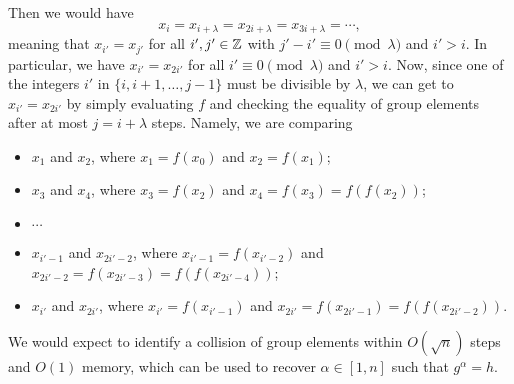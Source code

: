 Then we would have 
\[ x_i = x_{i+\lambda} = x_{2i+\lambda} = x_{3i+\lambda} = \cdots, \]
meaning that $x_{i'} = x_{j'}$ for all $i', j' \in \mathbb{Z}$ with $j' - i' \equiv 0 \pmod 
\lambda$ and $i' > i$. In particular, we have $x_{i'} = x_{2i'}$ for all 
$i' \equiv 0 \pmod \lambda$ and $i' > i$. Now, since one of the integers $i'$ 
in $\{i, i+1, \dots, j-1\}$ must be divisible by $\lambda$, we can get to 
$x_{i'} = x_{2i'}$ by simply evaluating $f$ and checking the equality of 
group elements after at most $j = i+\lambda$ steps. Namely, we are comparing 
\begin{itemize}
      \item $x_1$ and $x_2$, where $x_1 = f(x_0)$ and $x_2 = f(x_1)$; 
      \item $x_3$ and $x_4$, where $x_3 = f(x_2)$ and $x_4 = f(x_3) = f(f(x_2))$;
      \item $\cdots$
      \item $x_{i'-1}$ and $x_{2i'-2}$, where $x_{i'-1} = f(x_{i'-2})$ and 
            $x_{2i'-2} = f(x_{2i'-3}) = f(f(x_{2i'-4}))$; 
      \item $x_{i'}$ and $x_{2i'}$, where $x_{i'} = f(x_{i'-1})$ and 
            $x_{2i'} = f(x_{2i'-1}) = f(f(x_{2i'-2}))$. 
\end{itemize}
We would expect to identify a collision of group elements within $O(\sqrt n)$ 
steps and $O(1)$ memory, which can be used to recover $\alpha \in [1, n]$ 
such that $g^\alpha = h$. 